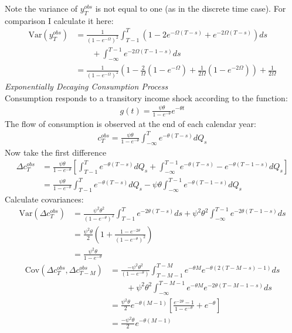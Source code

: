 Note the variance of $y_T^{obs}$ is not equal to one (as in the discrete time case). For comparison I calculate it here:
\begin{align*}
\mathrm{Var}( y_T^{obs}) &= \frac{1}{(1-e^{-\Omega})^2}\int_{T-1}^{T} ( 1 - 2e^{-\Omega (T-s)}  + e^{-2\Omega (T-s)}) ds \\
& \qquad +  \int_{-\infty}^{T-1}  e^{-2\Omega (T-1-s)} ds \\
&= \frac{1}{(1-e^{-\Omega})^2}\left( 1 - \frac{2}{\Omega}(1-e^{-\Omega})    + \frac{1}{2\Omega}(1-e^{-2\Omega}) \right) +  \frac{1}{2\Omega}
\end{align*}
\textit{Exponentially Decaying Consumption Process}\\
Consumption responds to a transitory income shock according to the function:
\begin{align*}
g(t) = \frac{\psi \theta}{1-e^{-\theta}} e^{-\theta t}
\end{align*}
The flow of consumption is observed at the end of each calendar year:
\begin{align*}
c_T^{obs} = \frac{\psi \theta}{1-e^{-\theta}} \int_{-\infty}^{T} e^{-\theta (T-s)}dQ_s
\end{align*}
Now take the first difference
\begin{align*}
\Delta c_T^{obs} &= \frac{ \psi\theta}{1-e^{-\theta}} \left[ \int_{T-1}^{T} e^{-\theta (T-s)}dQ_s +  \int_{-\infty}^{T-1} e^{-\theta (T-s)} - e^{-\theta (T-1-s)}dQ_s \right] \\
&= \frac{ \psi \theta}{1-e^{-\theta}}  \int_{T-1}^{T} e^{-\theta (T-s)}dQ_s - \psi \theta \int_{-\infty}^{T-1} e^{-\theta (T-1-s)} dQ_s
\end{align*}
Calculate covariances:
\begin{align*}
\mathrm{Var}(\Delta c_T^{obs}) &= \frac{ \psi^2\theta^2}{(1-e^{-\theta})^2}  \int_{T-1}^{T} e^{-2\theta (T-s)}ds + \psi^2\theta^2 \int_{-\infty}^{T-1} e^{-2\theta (T-1-s)} ds \\
&= \frac{ \psi^2\theta}{2} \left(1+ \frac{ 1-e^{-2\theta}}{(1-e^{-\theta})^2} \right)\\
&= \frac{ \psi^2\theta}{1-e^{-\theta}}
\end{align*}
\begin{align*}
\mathrm{Cov}(\Delta c_T^{obs},\Delta c_{T-M}^{obs}) &= \frac{ -\psi^2\theta^2}{(1-e^{-\theta})}  \int_{T-M-1}^{T-M} e^{-\theta M}e^{-\theta (2(T-M-s)-1) }ds \\
& \qquad + \psi^2\theta^2 \int_{-\infty}^{T-M-1} e^{-\theta M} e^{-2\theta (T-M-1-s)} ds \\
&= \frac{\psi^2\theta}{2} e^{-\theta (M-1)} \left[ \frac{ e^{-2\theta}-1 }{1-e^{-\theta} }   + e^{-\theta}  \right] \\
&= \frac{-\psi^2\theta}{2} e^{-\theta (M-1)} 
\end{align*}

